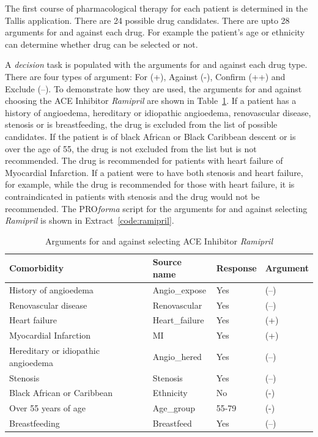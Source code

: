 \documentclass[11pt]{article}
\begin{document}
The first course of pharmacological therapy for each patient is determined in the Tallis application. There are 24 possible drug candidates. There are upto 28 arguments for and against each drug. For example the patient's age or ethnicity can determine whether drug can be selected or not.

A \textit{decision} task is populated with the arguments for and against each drug type. There are four types of argument: For (+), Against (-), Confirm (++) and Exclude (--). To demonstrate how they are used, the arguments for and against choosing the ACE Inhibitor \textit{Ramipril} are shown in Table~\ref{table:ramipril}. If a patient has a history of angioedema, hereditary or idiopathic angioedema, renovascular disease, stenosis or is breastfeeding, the drug is excluded from the list of possible candidates. If the patient is of black African or Black Caribbean descent or is over the age of 55, the drug is not excluded from the list but is not recommended. The drug is recommended for patients with heart failure of Myocardial Infarction. If a patient were to have both stenosis and heart failure, for example, while the drug is recommended for those with heart failure, it is contraindicated in patients with stenosis and the drug would not be recommended. The PRO\textit{forma} script for the arguments for and against selecting \textit{Ramipril} is shown in Extract~\ref{code:ramipril}.

\begin{table}[ht]
\begin{center}
\begin{tabular}{| l | l | l | l |}
\hline
\textbf{Comorbidity} & \textbf{Source name} & \textbf{Response} & \textbf{Argument} \\
\hline
History of angioedema & Angio\_expose & Yes & (--) \\
\hline
Renovascular disease & Renovascular & Yes & (--) \\
\hline
Heart failure & Heart\_failure & Yes & (+) \\
\hline
Myocardial Infarction & MI & Yes & (+) \\
\hline
Hereditary or idiopathic angioedema	& Angio\_hered & Yes & (--) \\
\hline
Stenosis & Stenosis & Yes & (--) \\
\hline
Black African or Caribbean & Ethnicity & No & (-) \\
\hline
Over 55 years of age & Age\_group & 55-79 & (-) \\
\hline
Breastfeeding & Breastfeed & Yes & (--) \\
\hline

\end{tabular}
\end{center}
\caption{Arguments for and against selecting ACE Inhibitor \textit{Ramipril}}
\label{table:ramipril}
\end{table}
\end{document}
